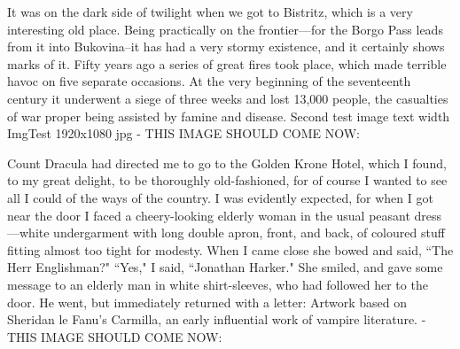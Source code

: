 \renewcommand{\varCaption}{First test image paper width ImgTest 1440x1086 jpg}
\renewcommand{\varImgPath}{_content/ImgTest_1440-1086.jpg}


It was on the dark side of twilight when we got to Bistritz, which is a very interesting old place. Being practically on the frontier---for the Borgo Pass leads from it into Bukovina--it has had a very stormy existence, and it certainly shows marks of it. Fifty years ago a series of great fires took place, which made terrible havoc on five separate occasions. At the very beginning of the seventeenth century it underwent a siege of three weeks and lost 13,000 people, the casualties of war proper being assisted by famine and disease. Second test image text width ImgTest 1920x1080 jpg - THIS IMAGE SHOULD COME NOW:

\renewcommand{\varCaption}{Second test image text width ImgTest 1920x1080 jpg}
\renewcommand{\varImgPath}{_content/ImgTest_1920-1080.jpg}


Count Dracula had directed me to go to the Golden Krone Hotel, which I found, to my great delight, to be thoroughly old-fashioned, for of course I wanted to see all I could of the ways of the country. I was evidently expected, for when I got near the door I faced a cheery-looking elderly woman in the usual peasant dress---white undergarment with long double apron, front, and back, of coloured stuff fitting almost too tight for modesty. When I came close she bowed and said, ``The Herr Englishman?" ``Yes," I said, ``Jonathan Harker." She smiled, and gave some message to an elderly man in white shirt-sleeves, who had followed her to the door. He went, but immediately returned with a letter: Artwork based on Sheridan le Fanu's Carmilla, an early influential work of vampire literature. - THIS IMAGE SHOULD COME NOW:

\renewcommand{\varCaption}{Artwork based on Sheridan le Fanu's Carmilla, an early influential work of vampire literature.}
\renewcommand{\varImgPath}{_content/Sheridan_le_Fanu_Carmilla-1600x1098.jpg}


